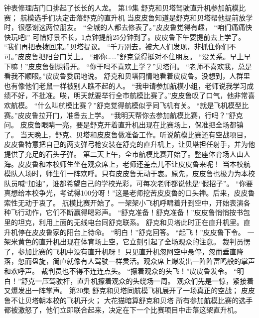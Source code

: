 \documentclass[a4paper,12pt,UTF8,twoside]{ctexbook}
\begin{document}
        钟表修理店门口排起了长长的人龙。   第19集   
        舒克和贝塔驾驶直升机参加航模比赛； 
        航模选手们决定击落舒克的直升机   
        当皮皮鲁知道是舒克和贝塔帮他提前放学时，很感谢这两位朋友。 
        “全城的人都去修表了。”皮皮鲁觉得有趣， 
        “咱们痛痛快快玩吧l” 
        可惜好景不长，1点钟提前25分钟到了。皮皮鲁下午要提前去上学了。 
        “我们再把表拨回来。”贝塔提议。 
        “千万别去，被大人们发现，非抓住你们不可。”皮皮鲁把阳台门关上。 
        “那你……”舒克觉得挺对不住朋友。 
        “没关系。早上早下嘛！”皮皮鲁倒想得开。 
        “你干吗不喜欢上学？”贝塔问。 
        “老师不喜欢我，总是看我不顺眼。”皮皮鲁委屈地说。 
        舒克和贝塔同情地看着皮皮鲁。没想到，人群里也有像他们老鼠一样被别人瞧不起的人。 
        “我申请参加航模小组，老师说我学习成绩不好，不批准。唉，明天就要举行全市航模比赛了。”皮皮鲁叹了口气，他非常喜欢航模。 
        “什么叫航模比赛？”舒克觉得航模似乎同飞机有关。 
        “就是飞机模型比赛。”皮皮鲁拉开门，准备去上学。 
        “我明天帮你去参加航模比赛，行吗？”舒克问。 
        皮皮鲁眼睛一亮，要是舒克开着直升机出现在比赛场上，保准把全场都镇了。 
        当天晚上，舒克、贝塔和皮皮鲁做准备工作。听说航模比赛还有空战项目，皮皮鲁特意把自己的两支弹弓枪安装在舒克的直升机上，让贝塔担任射手，并为他提供了充足的石头子弹。 
        第二天上午，全市航模比赛开始了。整座体育场人山人海。皮皮鲁和本校师生坐在观众席上，老师还差点儿不让皮皮鲁来呢！ 
        当本校航模队人场时，师生们一阵欢呼。只有皮皮鲁无动于衷。原先，皮皮鲁也极力为本校队员喊“加油”，谁都希望自己的学校光彩，可每次老师都说他是“假招子”。 
        “你要真想给本校争光，考试得100分呀！”这是老师挖苦皮皮鲁的口头禅。后来，皮皮鲁索性无动于衷了。 
        航模比赛开始了。一架架小飞机呼啸着升到空中，开始表演各种飞行动作，它们不断赢得喝彩声。 
        “舒克准备！舒克准备！”皮皮鲁悄悄按书包里的坦克，利用上面的无线电台同舒克联系。 
        舒克和贝塔此时正在直升机里。直升机停在皮皮鲁家的阳台上待命。 
        “明白！”舒克回答。 
        “起飞！”皮皮鲁下令。 
        一架米黄色的直升机出现在体育场上空，它立刻引起了全场观众的注意。 
        裁判员愣了，参加比赛的飞机中没有直升机呀！ 
        只见直升机忽阿空中悬停，忽而垂直降落，忽而盘旋，简直就像有人驾驶一样灵活。观众席上爆发出一阵阵富鸣般的掌声和欢呼声。 
        裁判员也不得不连连点头。 
        “擦着观众的头飞！”皮皮鲁发令。 
        “明白！”舒克一压驾驶杆，直升机擦着观众的头绕场一周。 
        观众们先是一惊，紧接着又爆发出一阵掌声。   第20集 
        舒克和贝塔同航模飞机展开了一场真正的空战； 
        皮皮鲁不让贝塔朝本校的飞机开火； 
        大花猫暗算舒克和贝塔   
        所有参加航模比赛的选手都被激怒了，他们立即联合起来，决定在下一个比赛项目中击落这架直升机。 
\end{document}
